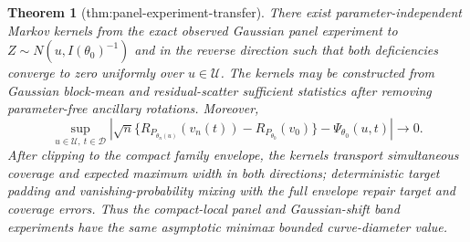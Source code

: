 \documentclass{article}
\newtheorem{theorem}{Theorem}
\begin{document}
\begin{theorem}[thm:panel-experiment-transfer]\label{thm:panel-experiment-transfer}
There exist parameter-independent Markov kernels from the exact observed Gaussian panel experiment to \(Z\sim N(u,I(\theta_0)^{-1})\) and in the reverse direction such that both deficiencies converge to zero uniformly over \(u\in\mathcal U\). The kernels may be constructed from Gaussian block-mean and residual-scatter sufficient statistics after removing parameter-free ancillary rotations. Moreover,
\[
\sup_{u\in\mathcal U,\ t\in\mathcal D}\left|\sqrt n\{R_{P_{\theta_n(u)}}(v_n(t))-R_{P_{\theta_0}}(v_0)\}-\Psi_{\theta_0}(u,t)\right|\longrightarrow0.
\]
After clipping to the compact family envelope, the kernels transport simultaneous coverage and expected maximum width in both directions; deterministic target padding and vanishing-probability mixing with the full envelope repair target and coverage errors. Thus the compact-local panel and Gaussian-shift band experiments have the same asymptotic minimax bounded curve-diameter value.
\end{theorem}
\end{document}
